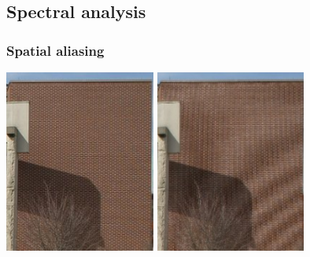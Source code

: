 \documentclass[compress]{beamer}
\begin{document}
\subsection[Spectral analysis]{Spectral analysis}

\begin{frame}\frametitle{Spatial aliasing}
\begin{center}
	\includegraphics[height=6cm]{./Figures/205px-Moire_pattern_of_bricks.pdf}
	\includegraphics[height=6cm]{./Figures/Moire_pattern_of_bricks_small.pdf}	
\end{center}
\end{frame}
\end{document}
